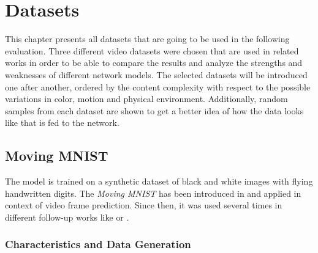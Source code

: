
\chapter{Datasets} \label{chapter:datasets}

This chapter presents all datasets that are going to be used in the following evaluation. Three different video datasets were chosen that are used in related works in order to be able to compare the results and analyze the strengths and weaknesses of different network models. The selected datasets will be introduced one after another, ordered by the content complexity with respect to the possible variations in color, motion and physical environment. Additionally, random samples from each dataset are shown to get a better idea of how the data looks like that is fed to the network.


\section{Moving MNIST} \label{sec:ds_mm}


The model is trained on a synthetic dataset of black and white images with flying handwritten digits. The \textit{Moving MNIST} has been introduced in \parencite{unsup_learn_lstm} and applied in context of video frame prediction. Since then, it was used several times in different follow-up works like \parencite{spat_temp_video_autoenc} or \parencite{conv_lstm_nowcasting}. 

\subsection{Characteristics and Data Generation}

